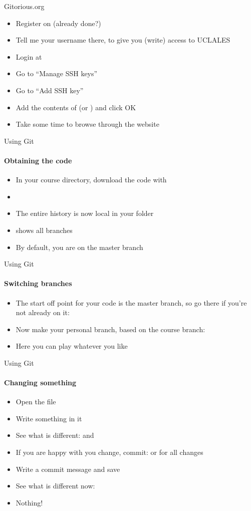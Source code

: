 \begin{frame}[<+->]{Gitorious.org}
 \begin{itemize}
  \item Register on  (already done?)
  \item Tell me your username there, to give you (write) access to UCLALES
  \item Login at 
  \item Go to ``Manage SSH keys''
  \item Go to ``Add SSH key''
  \item Add the contents of  (or ) and click OK
  \item Take some time to browse through the website
 \end{itemize}
\end{frame}
\begin{frame}[<+->]{Using Git}
\framesubtitle{Obtaining the code}
\begin{itemize}
 \item In your course directory, download the code with 
 \item {}
 \item The entire history is now local in your folder
 \item {} shows all branches
 \item By default, you are on the master branch
\end{itemize}
\end{frame}
\begin{frame}[<+->]{Using Git}
\framesubtitle{Switching branches}
\begin{itemize}
 \item The start off point for your code is the master branch, so go there if you're not already on it: 
 \item Now make your personal branch, based on the course branch: 
 \item Here you can play whatever you like
\end{itemize}
\end{frame}
\begin{frame}[<+->]{Using Git}
\framesubtitle{Changing something}
\begin{itemize}
\item Open the file 
\item Write something in it
\item See what is different:  and 
\item If you are happy with you change, commit:  or  for all changes
\item Write a commit message and save
\item See what is different now: 
\item Nothing!
\end{itemize}
\end{frame}

